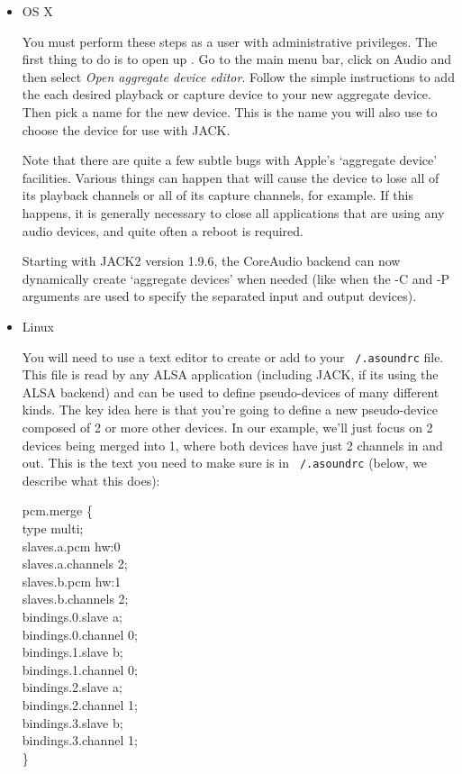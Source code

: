 \documentclass[10pt,a4paper]{book}
\newcommand{\button}[1]{#1}
\newcommand{\menu}[1]{\emph{\StrSubstitute{#1}{,}{ $\rightarrow$ }}}
\begin{document}
\begin{enumerate}
\begin{itemize}
\item OS X

You must perform these steps as a user with administrative
privileges. The first thing to do is to open up
\menu{Applications,Utilities,Audio/MIDI Setup}. Go to the main menu
bar, click on \button{Audio} and then select \emph{Open aggregate device
editor}. Follow the simple instructions to add the each desired
playback or capture device to your new aggregate device. Then pick a
name for the new device. This is the name you will also use to choose
the device for use with JACK\@.

Note that there are quite a few subtle bugs with Apple's `aggregate
device' facilities. Various things can happen that will cause the
device to lose all of its playback channels or all of its capture
channels, for example. If this happens, it is generally necessary to
close all applications that are using any audio devices, and quite
often a reboot is required.

Starting with JACK2 version 1.9.6, the CoreAudio backend can now
dynamically create `aggregate devices' when needed (like when the -C
and -P arguments are used to specify the separated input and output
devices).

\item Linux

You will need to use a text editor to create or add to your
\texttt{~/.asoundrc} file. This file is read by any ALSA application
(including JACK, if its using the ALSA backend) and can be used to
define pseudo-devices of many different kinds. The key idea here is
that you're going to define a new pseudo-device composed of 2 or more
other devices. In our example, we'll just focus on 2 devices being
merged into 1, where both devices have just 2 channels in and
out. This is the text you need to make sure is in \texttt{~/.asoundrc} (below,
we describe what this does):

\begin{listing}
pcm.merge \{\\
    type multi;\\
    slaves.a.pcm hw:0\\
    slaves.a.channels 2;\\
    slaves.b.pcm hw:1\\
    slaves.b.channels 2;\\
    bindings.0.slave a;\\
    bindings.0.channel 0;\\
    bindings.1.slave b;\\
    bindings.1.channel 0;\\
    bindings.2.slave a;\\
    bindings.2.channel 1;\\
    bindings.3.slave b;\\
    bindings.3.channel 1;\\
\}\\
\end{listing}


\end{itemize}
\end{enumerate}
\end{document}
